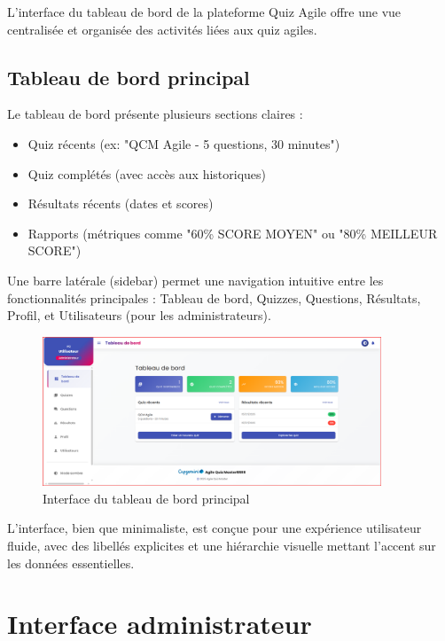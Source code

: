 \documentclass[12pt,a4paper]{report}
\begin{document}
L'interface du tableau de bord de la plateforme Quiz Agile offre une vue centralisée et organisée des activités liées aux quiz agiles.

\subsection{Tableau de bord principal}

Le tableau de bord présente plusieurs sections claires :

\begin{itemize}
    \item Quiz récents (ex: "QCM Agile - 5 questions, 30 minutes")
    \item Quiz complétés (avec accès aux historiques)
    \item Résultats récents (dates et scores)
    \item Rapports (métriques comme "60\% SCORE MOYEN" ou "80\% MEILLEUR SCORE")
\end{itemize}

Une barre latérale (sidebar) permet une navigation intuitive entre les fonctionnalités principales : Tableau de bord, Quizzes, Questions, Résultats, Profil, et Utilisateurs (pour les administrateurs).

\begin{figure}[H]
\centering
\includegraphics[width=0.9\textwidth]{latex_media/media/image52.png}
\caption{Interface du tableau de bord principal}
\label{fig:tableau-bord}
\end{figure}

L'interface, bien que minimaliste, est conçue pour une expérience utilisateur fluide, avec des libellés explicites et une hiérarchie visuelle mettant l'accent sur les données essentielles.

\section{Interface administrateur}
\end{document}
